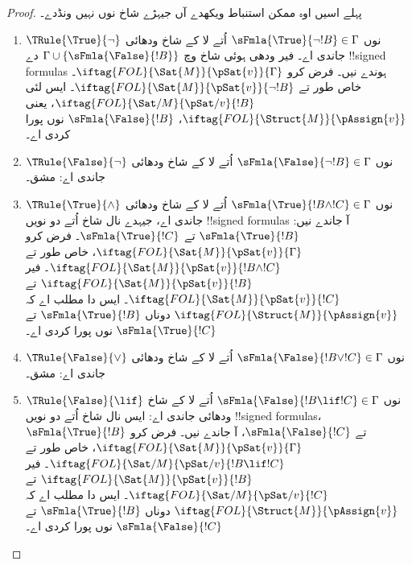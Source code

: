 \documentclass[../../../include/open-logic-section]{subfiles}
\begin{document}
\begin{proof}
پہلے اسیں اوہ ممکن استنباط ویکھدے آں جیہڑے شاخ نوں نہیں ونڈدے۔
\begin{enumerate}
\item $\TRule{\True}{\lnot}$ نوں
  $\sFmla{\True}{\lnot !B} \in \Gamma$ اُتے لا کے شاخ ودھائی جاندی اے۔ فیر ودھی ہوئی
  شاخ وچ $\Gamma \cup \{\sFmla{\False}{!B}\}$ دے !!{signed formula}s
  ہوندے نیں۔ فرض کرو
  $\iftag{FOL}{\Sat{M}}{\pSat{v}}{\Gamma}$۔ خاص طور تے
  $\iftag{FOL}{\Sat{M}}{\pSat{v}}{\lnot !B}$۔ ایس لئی
  $\iftag{FOL}{\Sat/{M}}{\pSat/{v}}{!B}$، یعنی
  $\iftag{FOL}{\Struct{M}}{\pAssign{v}}$،
  $\sFmla{\False}{!B}$ نوں پورا کردی اے۔
\item $\TRule{\False}{\lnot}$ نوں
  $\sFmla{\False}{\lnot !B} \in \Gamma$ اُتے لا کے شاخ ودھائی جاندی اے: مشق۔
\item $\TRule{\True}{\land}$ نوں
  $\sFmla{\True}{!B \land !C} \in \Gamma$ اُتے لا کے شاخ ودھائی جاندی اے، جیہدے نال
  شاخ اُتے دو نویں !!{signed formula}s آ جاندے نیں:
  $\sFmla{\True}{!B}$ تے $\sFmla{\True}{!C}$۔ فرض کرو
  $\iftag{FOL}{\Sat{M}}{\pSat{v}}{\Gamma}$، خاص طور تے
  $\iftag{FOL}{\Sat{M}}{\pSat{v}}{!B \land !C}$۔ فیر
  $\iftag{FOL}{\Sat{M}}{\pSat{v}}{!B}$ تے
  $\iftag{FOL}{\Sat{M}}{\pSat{v}}{!C}$۔ ایس دا مطلب اے کہ
  $\iftag{FOL}{\Struct{M}}{\pAssign{v}}$ دوناں
  $\sFmla{\True}{!B}$ تے $\sFmla{\True}{!C}$ نوں پورا کردی اے۔
\item $\TRule{\False}{\lor}$ نوں
  $\sFmla{\False}{!B \lor !C} \in \Gamma$ اُتے لا کے شاخ ودھائی جاندی اے: مشق۔
\item $\TRule{\False}{\lif}$ نوں
  $\sFmla{\False}{!B \lif !C} \in \Gamma$ اُتے لا کے شاخ ودھائی جاندی اے: ایس نال شاخ
  اُتے دو نویں !!{signed formula}s، $\sFmla{\True}{!B}$ تے
  $\sFmla{\False}{!C}$، آ جاندے نیں۔ فرض کرو
  $\iftag{FOL}{\Sat{M}}{\pSat{v}}{\Gamma}$، خاص طور تے
  $\iftag{FOL}{\Sat/{M}}{\pSat/{v}}{!B \lif !C}$۔ فیر
  $\iftag{FOL}{\Sat{M}}{\pSat{v}}{!B}$ تے
  $\iftag{FOL}{\Sat/{M}}{\pSat/{v}}{!C}$۔ ایس دا مطلب اے کہ
  $\iftag{FOL}{\Struct{M}}{\pAssign{v}}$ دوناں
  $\sFmla{\True}{!B}$ تے $\sFmla{\False}{!C}$ نوں پورا کردی اے۔

\end{enumerate}
\end{proof}
\end{document}
